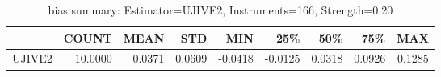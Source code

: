 \begin{table}[ht]
\centering
\caption{bias summary: Estimator=UJIVE2, Instruments=166, Strength=0.20}
\begin{tabular}{lrrrrrrrr}
\toprule
 & COUNT & MEAN & STD & MIN & 25\% & 50\% & 75\% & MAX \\
\midrule
UJIVE2 & 10.0000 & 0.0371 & 0.0609 & -0.0418 & -0.0125 & 0.0318 & 0.0926 & 0.1285 \\
\bottomrule
\end{tabular}
\end{table}
